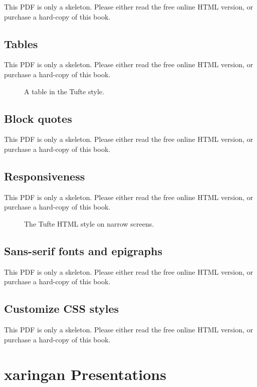 \documentclass[
  11pt,
]{krantz}
\theoremstyle{definition}
\theoremstyle{definition}
\theoremstyle{definition}
\theoremstyle{definition}
\theoremstyle{remark}
\begin{document}
This PDF is only a skeleton. Please either read the free online HTML version, or purchase a hard-copy of this book.

\section{Tables}\label{tufte-tables}

This PDF is only a skeleton. Please either read the free online HTML version, or purchase a hard-copy of this book.

\begin{figure}\caption{A table in the Tufte style.}\end{figure}

\section{Block quotes}\label{tufte-quotes}

This PDF is only a skeleton. Please either read the free online HTML version, or purchase a hard-copy of this book.

\section{Responsiveness}\label{tufte-responsiveness}

This PDF is only a skeleton. Please either read the free online HTML version, or purchase a hard-copy of this book.

\begin{figure}\caption{The Tufte HTML style on narrow screens.}\end{figure}

\section{Sans-serif fonts and epigraphs}\label{tufte-sans}

This PDF is only a skeleton. Please either read the free online HTML version, or purchase a hard-copy of this book.

\section{Customize CSS styles}\label{tufte-css}

This PDF is only a skeleton. Please either read the free online HTML version, or purchase a hard-copy of this book.

\chapter{xaringan Presentations}\label{xaringan}
\end{document}
